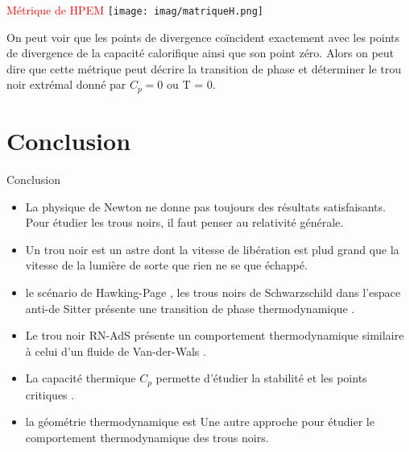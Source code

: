 \documentclass{beamer}
\begin{document}
\begin{frame}
\textcolor{red}{Métrique de HPEM}
\texttt{[image: imag/matriqueH.png]}
\begin{block}{}
	On peut voir que les points de divergence coïncident exactement avec les points de
	divergence de la capacité calorifique ainsi que son point zéro. Alors on peut dire que cette
	métrique peut décrire la transition de phase et déterminer le trou noir extrémal donné
	par $C_{p} = 0$ ou T = 0.\\
\end{block}
\end{frame}
\section{Conclusion}
\begin{frame}
\begin{block}{Conclusion}
\begin{itemize}
	\item La physique de Newton ne donne pas toujours des résultats
	satisfaisants. Pour étudier les trous noirs, il faut penser au
	relativité générale.
	\item Un trou noir est un astre dont la vitesse de libération est plud grand que la vitesse de la lumière de sorte que rien ne se que échappé.
	\item le scénario de Hawking-Page , les trous noirs de Schwarzschild dans
	l’espace anti-de Sitter présente une transition de phase thermodynamique .
	\item Le trou noir RN-AdS présente un comportement
	thermodynamique similaire à celui d’un fluide de
	Van-der-Wals .
	\item La capacité thermique $ C_{p}$
	permette d'étudier la stabilité et les points critiques .
	\item  la géométrie thermodynamique est Une autre approche pour étudier le comportement thermodynamique des trous noirs.
\end{itemize}
\end{block}

\end{frame}
\end{document}
